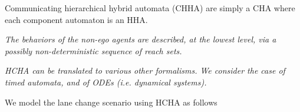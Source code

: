 \begin{defn}
	\label{def:CHHA}
	
	
\end{defn}
Communicating hierarchical hybrid automata (CHHA) are simply a CHA where each component automaton is an HHA.



%
%

{\it The behaviors of the non-ego agents are described, at the lowest level, via a possibly non-deterministic sequence of reach sets.}

{\it HCHA can be translated to various other formalisms. We consider the case of timed automata, and of ODEs (i.e. dynamical systems).}

\begin{exmp}
	We model the lane change scenario using HCHA as follows
	\end{exmp}
